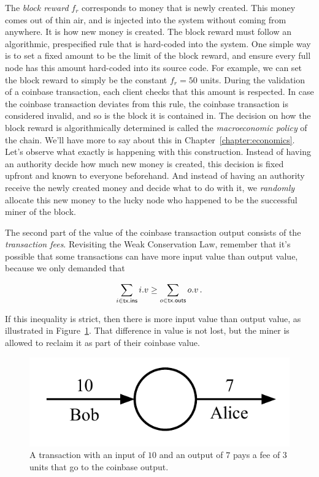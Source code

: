 The \emph{block reward} $f_r$ corresponds
to money that is newly created. This money comes out of thin air, and is injected into the system
without coming from anywhere. It is how new money is created. The block reward must follow an
algorithmic, prespecified rule that is hard-coded into the system. One simple way is to set a fixed
amount to be the limit of the block reward, and ensure every full node has this amount hard-coded
into its source code. For example, we can set the block reward to simply be the constant $f_r = 50$ units.
During the validation of a coinbase transaction, each client checks that this
amount is respected. In case the coinbase transaction deviates from this rule, the coinbase transaction
is considered invalid, and so is the block it is contained in. The decision on how the block reward
is algorithmically determined is called the \emph{macroeconomic policy} of the chain. We'll have
more to say about this in Chapter~\ref{chapter:economics}. Let's observe what exactly is happening
with this construction. Instead of having an authority decide how much new money is created, this
decision is fixed upfront and known to everyone beforehand. And instead of having an authority
receive the newly created money and decide what to do with it, we \emph{randomly} allocate this
new money to the lucky node who happened to be the successful miner of the block.

The second part of the value of the coinbase transaction output consists of the \emph{transaction fees}.
Revisiting the Weak Conservation Law, remember that it's possible that some transactions can have
more input value than output value, because we only demanded that

\[
    \sum_{i \in \mathsf{tx}\textsf{.ins}} i.v \geq \sum_{o \in \mathsf{tx}\textsf{.outs}} o.v\,.
\]

If this inequality is strict, then there is more input value than output value, as illustrated
in Figure~\ref{fig.fee}. That difference in value
is not lost, but the miner is allowed to reclaim it as part of their coinbase value.

\begin{figure}[h]
    \centering
    \includegraphics[width=0.4 \columnwidth,keepaspectratio]{figures/fee.pdf}
    \caption{A transaction with an input of $10$ and an output of $7$ pays a fee of $3$ units that
             go to the coinbase output.}
    \label{fig.fee}
\end{figure}

